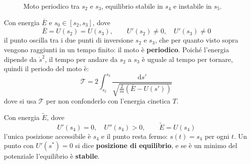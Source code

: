 \documentclass[11pt, a4paper, openright]{book}
\theoremstyle{plain}
\theoremstyle{definition}
\theoremstyle{remark}
\begin{document}
    \begin{figure}[H]
        \centering
        \caption{Moto periodico tra $s_2$ e $s_3$, equilibrio stabile in $s_4$ e instabile in $s_5$.}
    \end{figure}

    Con energia $\bar{E}$ e $s_0 \in [s_2, s_3]$, dove
    \begin{equation}
        \bar{E} = U(s_2) = U(s_3), \qquad U'(s_2) \neq 0, \quad U'(s_3) \neq 0
    \end{equation}
    il punto oscilla tra i due punti di inversione $s_2$ e $s_3$, che per quanto visto sopra vengono raggiunti in un tempo finito: il moto è \textbf{periodico}. Poiché l'energia dipende da $\dot{s}^2$, il tempo per andare da $s_2$ a $s_3$ è uguale al tempo per tornare, quindi il periodo del moto è:
    \begin{equation}
        \mathcal{T} = 2\int_{s_2}^{s_3} \frac{\mathrm{d}s'}{\sqrt{\frac{2}{m}(\bar{E} - U(s'))}}
    \end{equation}
    dove si usa $\mathcal{T}$ per non confonderlo con l'energia cinetica $T$.

    Con energia $\tilde{E}$, dove
    \begin{equation}
        U'(s_4) = 0, \quad U''(s_4) > 0, \qquad \tilde{E} = U(s_4)
    \end{equation}
    l'unica posizione accessibile è $s_4$ e il punto resta fermo: $s(t) = s_4$ per ogni $t$. Un punto con $U'(s^*) = 0$ si dice \textbf{posizione di equilibrio}, e se è un minimo del potenziale l'equilibrio è \textbf{stabile}.
\end{document}
